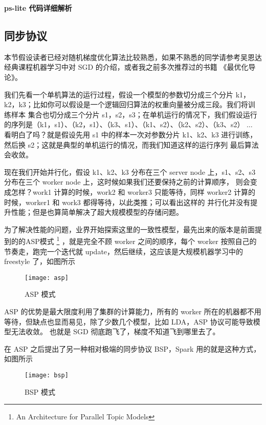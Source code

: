 \textbf{ps-lite 代码详细解析}  %

\subsection{同步协议}\label{subsec:ps-synchronous}

本节假设读者已经对随机梯度优化算法比较熟悉，如果不熟悉的同学请参考吴恩达经典课程机器学习中对 SGD 的介绍，或者我之前多次推荐过的书籍
《{\color{red}最优化导论}》。

我们先看一个单机算法的运行过程，假设一个模型的参数切分成三个分片 k1，k2，k3；比如你可以假设是一个逻辑回归算法的权重向量被分成三段。我们将训练样本
集合也切分成三个分片 s1，s2，s3；在单机运行的情况下，我们假设运行的序列是（k1，s1）、（k2，s1）、（k3、s1）、（k1、s2）、（k2、s2）、（k3、s2）
$\dots$ 看明白了吗？就是假设先用 s1 中的样本一次对参数分片 k1、k2、k3 进行训练，然后换 s2；这就是典型的单机运行的情况，而我们知道这样的运行序列
最后算法会收敛。

现在我们开始并行化，假设 k1、k2、k3 分布在三个 server node 上，s1、s2、s3 分布在三个 worker node 上，这时候如果我们还要保持之前的计算顺序，
则会变成怎样？work1 计算的时候，work2 和 worker3 只能等待，同样 worker2 计算的时候，worker1 和 work3 都得等待，以此类推；可以看出这样的
并行化并没有提升性能；但是也算简单解决了超大规模模型的存储问题。

为了解决性能的问题，业界开始探索这里的一致性模型，最先出来的版本是前面提到的的ASP模式%
\footnote{An Architecture for Parallel Topic Models}%
，就是完全不顾 worker 之间的顺序，每个 worker 按照自己的节奏走，跑完一个迭代就 update，然后继续，这应该是大规模机器学习中的 freestyle 了，如图所示

\begin{figure}[hbtp]
\centering
\texttt{[image: asp]}
\caption{ASP 模式}
\end{figure}

ASP 的优势是最大限度利用了集群的计算能力，所有的 worker 所在的机器都不用等待，但缺点也显而易见，除了少数几个模型，比如 LDA，ASP 协议可能导致模型无法收敛。
也就是 SGD 彻底跑飞了，梯度不知道飞到哪里去了。

在 ASP 之后提出了另一种相对极端的同步协议 BSP，Spark 用的就是这种方式，如图所示

\begin{figure}[hbtp]
\centering
\texttt{[image: bsp]}
\caption{BSP 模式}
\end{figure}

